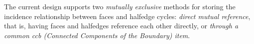 The current design supports two {\em mutually exclusive} methods for 
storing the incidence relationship between faces and halfedge cycles:
{\em direct mutual reference}, that is, having faces and halfedges reference 
each other directly, or {\em through a common ccb (Connected Components of the Boundary) item}.
 
